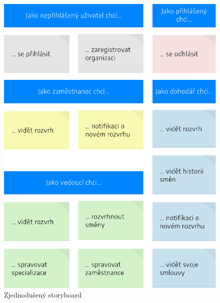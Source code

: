 \documentclass[twoside]{ctuthesis}
\begin{document}
\begin{enumerate}[label=\textbf{O\arabic*.}]
\begin{figure}[h!]
	\includegraphics[scale=0.8]{user-stories.pdf}
	\caption{Zjednodušený storyboard}
	\label{fig:user-stories}
\end{figure}

% 
%
%
% 		



\end{enumerate}
\end{document}
